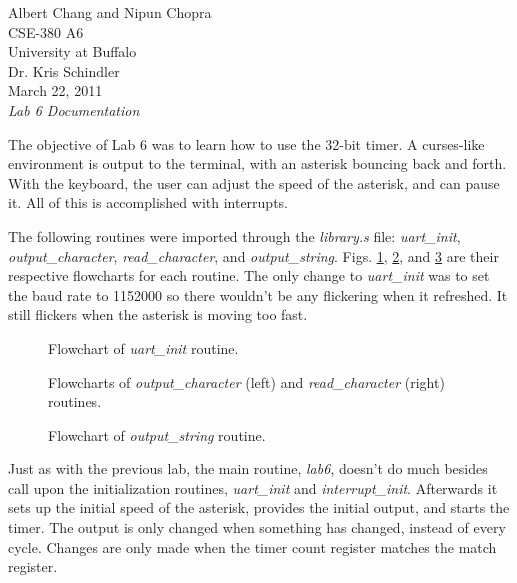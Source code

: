 \documentclass[letterpaper,10pt]{article}
\begin{document}
    Albert Chang and Nipun Chopra\\
    CSE-380 A6\\
    University at Buffalo\\
    Dr. Kris Schindler\\
    March 22, 2011\\
    \textit{Lab 6 Documentation}

    The objective of Lab 6 was to learn how to use the 32-bit timer. A curses-like
    environment is output to the terminal, with an asterisk bouncing back and
    forth. With the keyboard, the user can adjust the speed of the asterisk, and
    can pause it. All of this is accomplished with interrupts.

    The following routines were imported through the \textit{library.s} file:
    \textit{uart\_init}, \textit{output\_character}, \textit{read\_character},
    and \textit{output\_string}. Figs. \ref{flo:uart_init},
    \ref{flo:io_char}, and \ref{flo:output_string} are their respective
    flowcharts for each routine. The only change to \textit{uart\_init} was to
    set the baud rate to 1152000 so there wouldn't be any flickering when it
    refreshed. It still flickers when the asterisk is moving too fast.

    \begin{figure}[h]
        
        \caption{Flowchart of \textit{uart\_init} routine.}
        \label{flo:uart_init}
    \end{figure}

    \begin{figure}[h]
        \begin{minipage}{0.5\linewidth}
            
        \end{minipage}%
        \begin{minipage}{0.5\linewidth}
            
        \end{minipage}
        \caption{Flowcharts of \textit{output\_character} (left) and \textit{read\_character} (right) routines.}
        \label{flo:io_char}
    \end{figure}

    \begin{figure}[h]
        
        \caption{Flowchart of \textit{output\_string} routine.}
        \label{flo:output_string}
    \end{figure}

    \clearpage

    Just as with the previous lab, the main routine, \textit{lab6}, doesn't do
    much besides call upon the initialization routines, \textit{uart\_init} and
    \textit{interrupt\_init}. Afterwards it sets up the initial speed of the
    asterisk, provides the initial output, and starts the timer. The output is
    only changed when something has changed, instead of every cycle. Changes
    are only made when the timer count register matches the match register.
\end{document}
